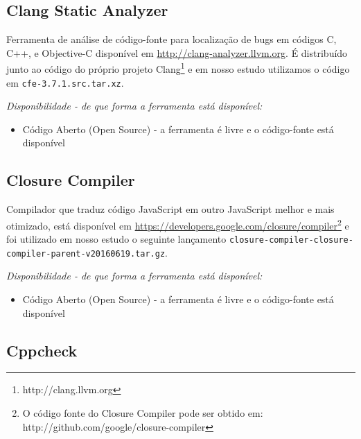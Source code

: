 \subsection{Clang Static Analyzer}

Ferramenta de análise de código-fonte para
localização de bugs em códigos C, C++, e Objective-C disponível em
\url{http://clang-analyzer.llvm.org}. É distribuído junto ao código do próprio
projeto Clang\footnote{http://clang.llvm.org} e em nosso estudo utilizamos o
código em \texttt{cfe-3.7.1.src.tar.xz}.

\begin{description}

  \item {\it Disponibilidade - de que forma a ferramenta está disponível:}
    \begin{itemize}
      \item Código Aberto (Open Source) - a ferramenta é livre e o código-fonte está disponível
    \end{itemize}

\end{description}

\subsection{Closure Compiler}

Compilador que traduz código JavaScript em outro
JavaScript melhor e mais otimizado, está disponível em
\url{https://developers.google.com/closure/compiler}\footnote{O código fonte do
Closure Compiler pode ser obtido em:
http://github.com/google/closure-compiler} e foi utilizado em nosso estudo o
seguinte lançamento
\texttt{closure-compiler-closure-compiler-parent-v20160619.tar.gz}.

\begin{description}

  \item {\it Disponibilidade - de que forma a ferramenta está disponível:}
    \begin{itemize}
      \item Código Aberto (Open Source) - a ferramenta é livre e o código-fonte está disponível
    \end{itemize}

\end{description}

\subsection{Cppcheck}

